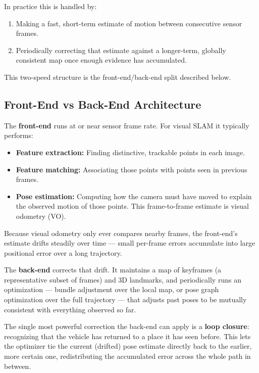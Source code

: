 \documentclass[11pt,a4paper]{article}
\begin{document}
In practice this is handled by:
\begin{enumerate}
    \item Making a fast, short-term estimate of motion between consecutive sensor frames.
    \item Periodically correcting that estimate against a longer-term, globally consistent map once enough evidence has accumulated.
\end{enumerate}
This two-speed structure is the front-end/back-end split described below.

\subsection{Front-End vs Back-End Architecture}
The \textbf{front-end} runs at or near sensor frame rate. For visual SLAM it typically performs:
\begin{itemize}[noitemsep]
    \item \textbf{Feature extraction:} Finding distinctive, trackable points in each image.
    \item \textbf{Feature matching:} Associating those points with points seen in previous frames.
    \item \textbf{Pose estimation:} Computing how the camera must have moved to explain the observed motion of those points. This frame-to-frame estimate is visual odometry (VO).
\end{itemize}
Because visual odometry only ever compares nearby frames, the front-end's estimate drifts steadily over time --- small per-frame errors accumulate into large positional error over a long trajectory.

The \textbf{back-end} corrects that drift. It maintains a map of keyframes (a representative subset of frames) and 3D landmarks, and periodically runs an optimization --- bundle adjustment over the local map, or pose graph optimization over the full trajectory --- that adjusts past poses to be mutually consistent with everything observed so far.

The single most powerful correction the back-end can apply is a \textbf{loop closure}: recognizing that the vehicle has returned to a place it has seen before. This lets the optimizer tie the current (drifted) pose estimate directly back to the earlier, more certain one, redistributing the accumulated error across the whole path in between.
\end{document}
